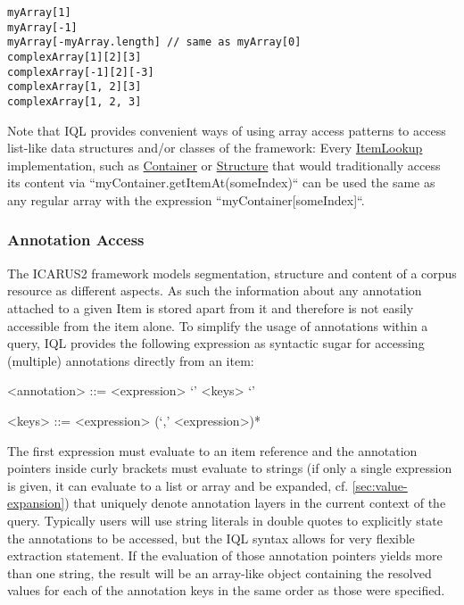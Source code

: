 \documentclass[11pt,a4paper,portrait]{article}
\newcommand{\iql}{IQL\xspace}
\newcommand{\repoUrl}{https://github.com/ICARUS-tooling/icarus2-modeling-framework/blob/dev/}
\newcommand{\modelsUrl}{\repoUrl icarus2-model-api/src/main/java/de/ims/icarus2/model/api/}
\newcommand{\repoLink}[2]{\href{#1}{#2}}
\begin{document}
\begin{verbatim}
myArray[1]
myArray[-1]
myArray[-myArray.length] // same as myArray[0]
complexArray[1][2][3]
complexArray[-1][2][-3]
complexArray[1, 2][3]
complexArray[1, 2, 3]
\end{verbatim}

\noindent Note that \iql provides convenient ways of using array access patterns to access list-like data structures and/or classes of the framework:
Every \repoLink{\modelsUrl /members/item/manager/ItemLookup.java}{ItemLookup} implementation, such as \repoLink{\modelsUrl /members/container/Container.java}{Container} or \repoLink{/members/structure/Structure.java}{Structure} that would traditionally access its content via ``myContainer.getItemAt(someIndex)`` can be used the same as any regular array with the expression ``myContainer[someIndex]``.

\subsubsection{Annotation Access}
\label{sec:annotation-access}

The ICARUS2 framework models segmentation, structure and content of a corpus resource as different aspects. As such the information about any annotation attached to a given Item is stored apart from it and therefore is not easily accessible from the item alone. To simplify the usage of annotations within a query, \iql provides the following expression as syntactic sugar for accessing (multiple) annotations directly from an item:

\begin{grammar}	
	<annotation> ::= <expression> `{' <keys> `}'
	
	<keys> ::= <expression> (`,' <expression>)*
\end{grammar}

\noindent The first expression must evaluate to an item reference and the annotation pointers inside curly brackets must evaluate to strings (if only a single expression is given, it can evaluate to a list or array and be expanded, cf. \cref{sec:value-expansion}) that uniquely denote annotation layers in the current context of the query. Typically users will use string literals in double quotes to explicitly state the annotations to be accessed, but the \iql syntax allows for very flexible extraction statement. If the evaluation of those annotation pointers yields more than one string, the result will be an array-like object containing the resolved values for each of the annotation keys in the same order as those were specified.
\end{document}
